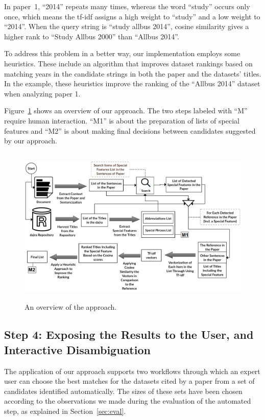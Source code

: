 \documentclass{IOS-Book-Article}
\begin{document}
In paper~1, \enquote{2014} repeats many times, whereas the word \enquote{study} occurs only once, which means the tf-idf assigns a high weight to \enquote{study} and a low weight to \enquote{2014}. When the query string is \enquote{study allbus 2014}, cosine similarity gives a higher rank to \enquote{Study Allbus 2000} than \enquote{Allbus 2014}.

To address this problem in a better way, our implementation employs some heuristics.
These include an algorithm that improves dataset rankings based on matching years in the candidate strings in both the paper and the datasets' titles.
In the example, these heuristics improve the ranking of the \enquote{Allbus 2014} dataset when analyzing paper 1. 

Figure~\ref{fig:Overview_of_approach} shows an overview of our approach.
The two steps labeled with \enquote{M} require human interaction.
\enquote{M1} is about the preparation of lists of special features and \enquote{M2} is about making final decisions between candidates suggested by our approach.

\begin{figure}[h]
	\centering
	\includegraphics[height=3in]{Overwveiw_System.png}
	\caption{An overview of the approach.}
	\label{fig:Overview_of_approach}
\end{figure}

\subsection{Step 4: Exposing the Results to the User, and Interactive Disambiguation}
\label{sec:expos-results-reus}	
The application of our approach supports two workflows through which an expert user can choose the best matches for the datasets cited by a paper from a set of candidates identified automatically. The sizes of these sets have been chosen according to the observations we made during the evaluation of the automated step, as explained in Section~\ref{sec:eval}.
\end{document}
